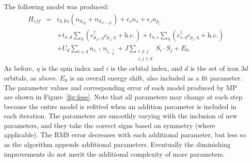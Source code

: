 The following model was produced:
\begin{eqnarray}
  H_{eff} &=& \epsilon_{\delta,\mathrm{Fe}} (n_{d_{xy}} + n_{d_{x^2-y^2}}) + \epsilon_s n_{s}+\epsilon_{z} n_{p_z} \nonumber \\
          &&+ t_{\sigma,d} \sum_{\eta} \left( c_{d_{z^2},\eta}^{\dagger} c_{p_z,\eta} + \text{h.c.} \right)+t_{\sigma,s} \sum_{\eta} \left(c_{s,\eta}^{\dagger}  c_{p_z,\eta} + \text{h.c.} \right)
              \nonumber \\
          &&+ U_d \sum_{i \in d} n_{i,\uparrow} n_{i,\downarrow} + J \sum_{\substack{i\ne j \\i,j \in d}} S_i \cdot S_j + E_0. \label{eq:fesemodel}
\end{eqnarray}
As before, $\eta$ is the spin index and $i$ is the orbital index, and $d$ is the set of iron $3d$ orbitals, as above.
$E_0$ is an overall energy shift, also included as a fit parameter.
The parameter values and corresponding error of each model produced by MP are shown in Figure~\ref{fig:fese}.
Note that all parameters may change at each step because the entire model is refitted when an addition parameter is included in each iteration.
The parameters are smoothly varying with the inclusion of new parameters, and they take the correct signs based on symmetry (where applicable). 
The RMS error decreases with each additional parameter, but less so as the algorithm appends additional parameters. 
Eventually the diminishing improvements do not merit the additional complexity of more parameters.

